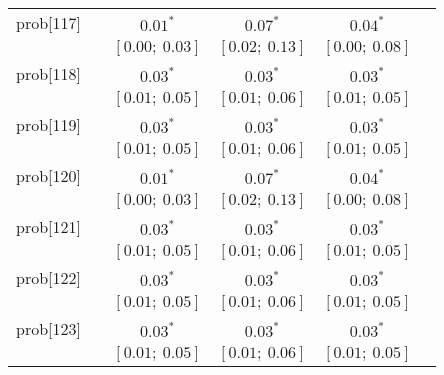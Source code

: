 \begin{table}
\begin{center}
\begin{tabular}{l c c c c c }
prob[117]   &                                  & $0.01^{*}$                & $0.07^{*}$                & $0.04^{*}$              &                         \\
            &                                  & $[0.00;\ 0.03]$           & $[0.02;\ 0.13]$           & $[0.00;\ 0.08]$         &                         \\
prob[118]   &                                  & $0.03^{*}$                & $0.03^{*}$                & $0.03^{*}$              &                         \\
            &                                  & $[0.01;\ 0.05]$           & $[0.01;\ 0.06]$           & $[0.01;\ 0.05]$         &                         \\
prob[119]   &                                  & $0.03^{*}$                & $0.03^{*}$                & $0.03^{*}$              &                         \\
            &                                  & $[0.01;\ 0.05]$           & $[0.01;\ 0.06]$           & $[0.01;\ 0.05]$         &                         \\
prob[120]   &                                  & $0.01^{*}$                & $0.07^{*}$                & $0.04^{*}$              &                         \\
            &                                  & $[0.00;\ 0.03]$           & $[0.02;\ 0.13]$           & $[0.00;\ 0.08]$         &                         \\
prob[121]   &                                  & $0.03^{*}$                & $0.03^{*}$                & $0.03^{*}$              &                         \\
            &                                  & $[0.01;\ 0.05]$           & $[0.01;\ 0.06]$           & $[0.01;\ 0.05]$         &                         \\
prob[122]   &                                  & $0.03^{*}$                & $0.03^{*}$                & $0.03^{*}$              &                         \\
            &                                  & $[0.01;\ 0.05]$           & $[0.01;\ 0.06]$           & $[0.01;\ 0.05]$         &                         \\
prob[123]   &                                  & $0.03^{*}$                & $0.03^{*}$                & $0.03^{*}$              &                         \\
            &                                  & $[0.01;\ 0.05]$           & $[0.01;\ 0.06]$           & $[0.01;\ 0.05]$         &                         \\

\end{tabular}
\end{center}
\end{table}
